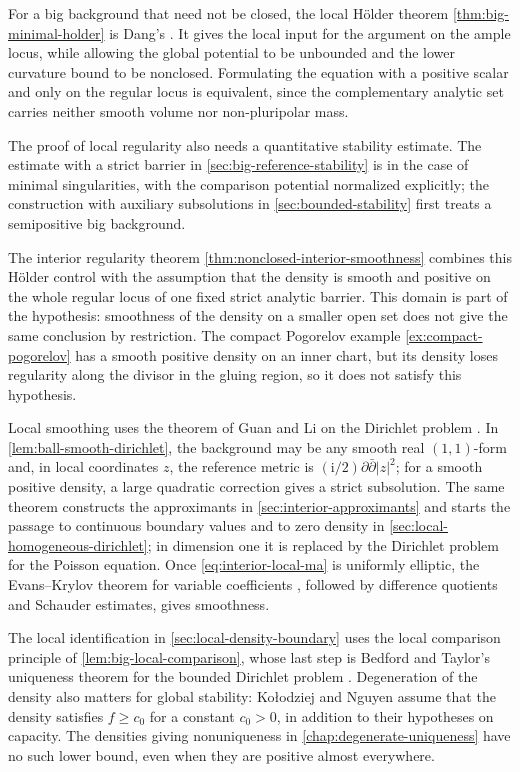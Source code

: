 For a big background that need not be closed, the local H\"older theorem \cref{thm:big-minimal-holder} is Dang's \cite[v2, Theorem~A and Theorem~3.1]{Dang26}. It gives the local input for the argument on the ample locus, while allowing the global potential to be unbounded and the lower curvature bound to be nonclosed. Formulating the equation with a positive scalar and only on the regular locus is equivalent, since the complementary analytic set carries neither smooth volume nor non-pluripolar mass.

The proof of local regularity also needs a quantitative stability estimate. The estimate with a strict barrier in \cref{sec:big-reference-stability} is \cite[v2, Theorem~3.3 and Remark~3.4]{Dang26} in the case of minimal singularities, with the comparison potential normalized explicitly; the construction with auxiliary subsolutions in \cref{sec:bounded-stability} first treats a semipositive big background.

The interior regularity theorem \cref{thm:nonclosed-interior-smoothness} combines this H\"older control with the assumption that the density is smooth and positive on the whole regular locus of one fixed strict analytic barrier. This domain is part of the hypothesis: smoothness of the density on a smaller open set does not give the same conclusion by restriction. The compact Pogorelov example \cref{ex:compact-pogorelov} has a smooth positive density on an inner chart, but its density loses regularity along the divisor in the gluing region, so it does not satisfy this hypothesis.

Local smoothing uses the theorem of Guan and Li on the Dirichlet problem \cite[Theorem~1.1]{GL10}. In \cref{lem:ball-smooth-dirichlet}, the background may be any smooth real $(1,1)$-form and, in local coordinates $z$, the reference metric is $(\mathrm i/2)\partial\bar\partial|z|^2$; for a smooth positive density, a large quadratic correction gives a strict subsolution. The same theorem constructs the approximants in \cref{sec:interior-approximants} and starts the passage to continuous boundary values and to zero density in \cref{sec:local-homogeneous-dirichlet}; in dimension one it is replaced by the Dirichlet problem for the Poisson equation. Once \eqref{eq:interior-local-ma} is uniformly elliptic, the Evans--Krylov theorem for variable coefficients \cite[Definition~3.2, Theorem~3.4, and the paragraph following it, pp.~444--445]{TWWY15}, followed by difference quotients and Schauder estimates, gives smoothness.

The local identification in \cref{sec:local-density-boundary} uses the local comparison principle of \cref{lem:big-local-comparison}, whose last step is Bedford and Taylor's uniqueness theorem for the bounded Dirichlet problem \cite[Corollary~4.4, p.~17]{BT82}. Degeneration of the density also matters for global stability: Ko{\l}odziej and Nguyen \cite[Theorem 4.1]{KN21} assume that the density satisfies $f\geq c_0$ for a constant $c_0>0$, in addition to their hypotheses on capacity. The densities giving nonuniqueness in \cref{chap:degenerate-uniqueness} have no such lower bound, even when they are positive almost everywhere.


